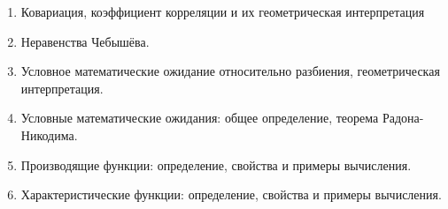 \documentclass[a4paper]{article}
\theoremstyle{definition}
\theoremstyle{remark}
\begin{document}
\begin{enumerate}
    \item Ковариация, коэффициент корреляции и их геометрическая интерпретация
    \item Неравенства Чебышёва.
    \item Условное математические ожидание относительно разбиения, геометрическая интерпретация.
    \item Условные математические ожидания: общее определение, теорема Радона-Никодима.
    \item Производящие функции: определение, свойства и примеры вычисления.
    \item Характеристические функции: определение, свойства и примеры вычисления.
\end{enumerate}
\end{document}
